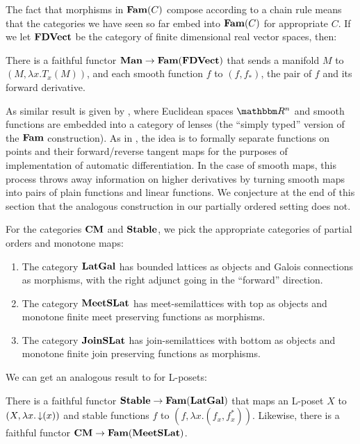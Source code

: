 The fact that morphisms in $\mathbf{Fam}(C)$ compose according to a chain rule
means that the categories we have seen so far embed into $\mathbf{Fam}(C)$ for
appropriate $C$. If we let $\mathbf{FDVect}$ be the category of finite
dimensional real vector spaces, then:

\begin{proposition}
  \label{prop:embed-manifolds}
  There is a faithful functor $\mathbf{Man} \to \mathbf{Fam}(\mathbf{FDVect})$ that sends a
  manifold $M$ to $(M, \lambda x. T_x(M))$, and each smooth function
  $f$ to $(f, f_*)$, the pair of $f$ and its forward derivative.
\end{proposition}

As similar result is given by \citet{cruttwell2022}, where Euclidean
spaces $\RR^n$ and smooth functions are embedded into a category of
lenses (the ``simply typed'' version of the $\mathbf{Fam}$ construction). As
in \citet{vakar22}, the idea is to formally separate functions on
points and their forward/reverse tangent maps for the purposes of
implementation of automatic differentiation. In the case of smooth
maps, this process throws away information on higher derivatives by
turning smooth maps into pairs of plain functions and linear
functions. We conjecture at the end of this section that the analogous
construction in our partially ordered setting does not.

For the categories $\mathbf{CM}$ and $\mathbf{Stable}$, we pick the appropriate
categories of partial orders and monotone maps:

\begin{definition}
  \item
  \begin{enumerate}
  \item The category $\mathbf{LatGal}$ has bounded lattices as objects and
    Galois connections as morphisms, with the right adjunct going in
    the ``forward'' direction.
  \item The category $\mathbf{MeetSLat}$ has meet-semilattices with top as
    objects and monotone finite meet preserving functions as
    morphisms.
  \item The category $\mathbf{JoinSLat}$ has join-semilattices with bottom as
    objects and monotone finite join preserving functions as
    morphisms.
  \end{enumerate}
\end{definition}

We can get an analogous result to  for L-posets:

\begin{proposition}
  \label{prop:embed-stable}
  There is a faithful functor $\mathbf{Stable} \to \mathbf{Fam}(\mathbf{LatGal})$ that maps an
  L-poset $X$ to $(X, \lambda x. \mathop{\downarrow}(x))$ and stable functions
  $f$ to $(f, \lambda x. (f_x, f^*_x))$. Likewise, there is a faithful
  functor $\mathbf{CM} \to \mathbf{Fam}(\mathbf{MeetSLat})$.
\end{proposition}

